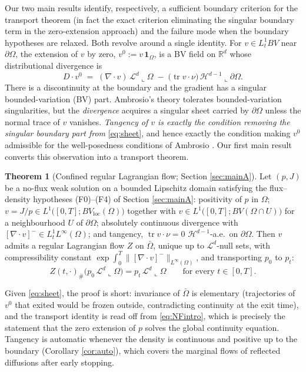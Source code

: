 \documentclass[11pt]{amsart}
\theoremstyle{definition}
\newtheorem{thmx}{Theorem}
\newcommand{\Ld}{\mathcal{L}^d}
\newcommand{\Hd}{\mathcal{H}^{d-1}}
\newcommand{\tr}{\operatorname{tr}}
\newcommand{\dive}{\nabla\!\cdot}
\newcommand{\R}{\mathbb{R}}
\begin{document}
Our two main results identify, respectively, a sufficient boundary
criterion for the transport theorem (in fact the exact criterion
eliminating the singular boundary term in the zero-extension
approach) and the failure mode when
the boundary hypotheses are relaxed. Both revolve around a single identity.
For $v \in L^1_t BV$ near $\partial\Omega$, the extension of $v$ by
zero, $v^0 := v\,\mathbf{1}_\Omega$, is a BV field on $\R^d$ whose
distributional divergence is
\begin{equation}\label{eq:sheet}
\boxed{\ \ D\!\cdot v^0 \;=\; (\dive v)\,\Ld\llcorner\Omega
\;-\;\big(\tr v\cdot\nu\big)\,\Hd\llcorner\partial\Omega . \ \ }
\end{equation}
There is a discontinuity  at the boundary and the gradient has a singular bounded-variation (BV) part. 
Ambrosio's theory \cite{Ambrosio04,Ambrosio08} tolerates bounded-variation singularities, but the
\emph{divergence} acquires a singular sheet carried by
$\partial\Omega$ unless the normal trace of $v$ vanishes.
\emph{Tangency of $v$ is exactly the condition removing the singular
boundary part from} \eqref{eq:sheet}, and hence exactly the condition
making $v^0$ admissible for the well-posedness conditions of Ambrosio
\cite{Ambrosio04}. Our first main result converts this observation
into a transport theorem.
\begin{thmx}[Confined regular Lagrangian flow; Section
\ref{sec:mainA}]\label{thm:A}
Let $(p,J)$ be a no-flux weak solution on a bounded Lipschitz domain
satisfying the flux--density hypotheses \textup{(F0)--(F4)} of
Section \ref{sec:mainA}: positivity of $p$ in $\Omega$; $v = J/p \in
L^1\big([0,T]; BV_{\mathrm{loc}}(\Omega)\big)$ together with $v \in
L^1\big([0,T]; BV(\Omega\cap U)\big)$ for a neighbourhood $U$ of
$\partial\Omega$; absolutely continuous divergence with $[\dive v]^-
\in L^1_tL^\infty(\Omega)$; and tangency, $\tr v\cdot\nu = 0$
$\Hd$-a.e.\ on $\partial\Omega$. Then $v$ admits a regular Lagrangian
flow $Z$ on $\bar\Omega$, unique up to $\Ld$-null sets,  with
compressibility constant
$\exp\int_0^T\|[\dive v]^-\|_{L^\infty(\Omega)}$, and transporting $p_0$ to $p_t$:
\[
Z(t,\cdot)_\#\big(p_0\,\Ld\llcorner\Omega\big)
= p_t\,\Ld\llcorner\Omega \qquad \text{for every } t\in[0,T].
\]
\end{thmx}
Given \eqref{eq:sheet}, the proof is short: invariance of
$\bar\Omega$ is elementary (trajectories of $v^0$ that exited would
be frozen outside, contradicting continuity at the exit time), and
the transport identity is read off from \eqref{eq:NFintro}, which is
precisely the statement that the zero extension of $p$ solves the
global continuity equation. Tangency is automatic whenever the
density is continuous and positive up to the boundary (Corollary
\ref{cor:auto}), which covers the marginal flows of reflected
diffusions after early stopping.
\end{document}
